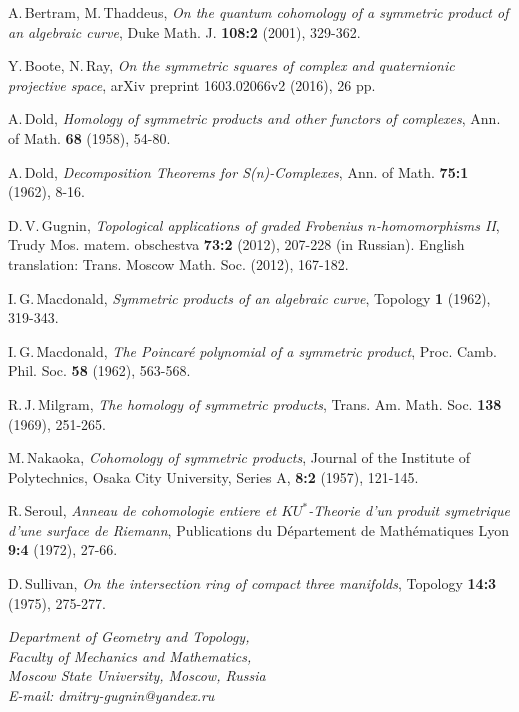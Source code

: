 \documentclass[a4paper,14pt]{article}
\begin{document}
\bigskip







\begin{thebibliography}{99}



 A.$\,$Bertram, M.$\,$Thaddeus, \textit{On the quantum cohomology of a symmetric product of an algebraic curve}, Duke Math. J. \textbf{108:2} (2001), 329-362. 

 Y.$\,$Boote, N.$\,$Ray, \textit{On the symmetric squares of complex and quaternionic projective space}, arXiv preprint 1603.02066v2 (2016), 26 pp. 

  A.$\,$Dold, \textit{Homology of symmetric products and other functors of complexes}, Ann. of Math. \textbf{68} (1958), 54-80.


  A.$\,$Dold, \textit{Decomposition Theorems for S(n)-Complexes}, Ann. of Math. \textbf{75:1} (1962), 8-16.


  D.$\,$V.$\,$Gugnin, \textit{Topological applications of graded Frobenius $n$-homomorphisms II}, Trudy Mos. matem. obschestva \textbf{73:2} (2012), 207-228 (in Russian). English translation: Trans. Moscow Math. Soc. (2012), 167-182.


  I.$\,$G.$\,$Macdonald, \textit{Symmetric products of an algebraic curve}, Topology \textbf{1} (1962), 319-343.


  I.$\,$G.$\,$Macdonald, \textit{The Poincar\'e polynomial of a symmetric product}, Proc. Camb. Phil. Soc. \textbf{58} (1962), 563-568.


  R.$\,$J.$\,$Milgram, \textit{The homology of symmetric products}, Trans. Am. Math. Soc. \textbf{138} (1969), 251-265.

 M.$\,$Nakaoka, \textit{Cohomology of symmetric products}, Journal of the Institute of Polytechnics, Osaka City University, Series A, \textbf{8:2} (1957), 121-145.

 R.$\,$Seroul, \textit{Anneau de cohomologie entiere et $KU^*$-Theorie d'un produit symetrique d'une surface de Riemann}, Publications du D\'epartement de Math\'ematiques Lyon \textbf{9:4} (1972), 27-66. 

 D.$\,$Sullivan, \textit{On the intersection ring of compact three manifolds}, Topology \textbf{14:3} (1975), 275-277.



\end{thebibliography}



\begin{flushleft}
{\it 
Department of Geometry and Topology, \\
Faculty of Mechanics and Mathematics, \\
Moscow State University, Moscow, Russia \\
E-mail: dmitry-gugnin@yandex.ru
}
\end{flushleft}
\end{document}
